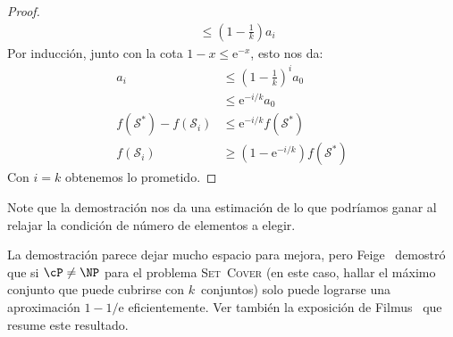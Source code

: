 \begin{proof}
\begin{align*}
        &\le \left(1 - \frac{1}{k}\right) a_i
    \end{align*}
    Por inducción,
    junto con la cota \(1 - x \le \mathrm{e}^{-x}\),
    esto nos da:
    \begin{align*}
      a_i
        &\le \left(1 - \frac{1}{k}\right)^i a_0 \\
        &\le \mathrm{e}^{- i/k} a_0 \\
      f(\mathscr{S}^*) - f(\mathscr{S}_i)
        &\le \mathrm{e}^{- i/k} f(\mathscr{S}^*) \\
      f(\mathscr{S}_i)
        &\ge \left( 1 - \mathrm{e}^{- i/k} \right) f(\mathscr{S}^*)
    \end{align*}
    Con \(i = k\) obtenemos lo prometido.
  \end{proof}
  Note que la demostración nos da una estimación de lo que podríamos ganar
  al relajar la condición de número de elementos a elegir.

  La demostración parece dejar mucho espacio para mejora,
  pero Feige~%
    \cite{feige98:_threshold_approximating_set_cover}
  demostró que si \(\cP \ne \NP\)
  para el problema \textsc{Set~Cover}
  (en este caso,
   hallar el máximo conjunto que puede cubrirse con \(k\)~conjuntos)
  solo puede lograrse una aproximación \(1 - 1/\mathrm{e}\) eficientemente.
  Ver también la exposición de Filmus~%
    \cite{filmus11:_hardness_approximating_set_cover}
  que resume este resultado.

